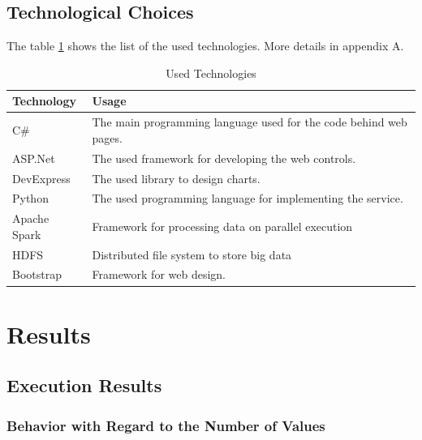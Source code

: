 \subsection{Technological Choices}
The table \ref{ut} shows the list of the used technologies. More details in appendix A.
\begin{table}[!h]
\caption{Used Technologies}
\begin{center}
\begin{tabularx}{17cm}{ |p{3cm}|X| } 
 \hline
 \textbf{Technology} & \textbf{Usage}  \\ \hline
 
C\# & The main programming language used for the code behind web pages.\\ \hline
ASP.Net & The used framework for developing the web controls. \\ \hline
DevExpress & The used library to design charts.\\ \hline
Python & The used programming language for implementing the service.\\ \hline
Apache Spark & Framework for processing data on parallel execution\\ \hline
HDFS & Distributed file system to store big data \\ \hline
Bootstrap & Framework for web design. \\ \hline
\end{tabularx}
\end{center}
\label{ut}
\end{table}
\section{Results}
\subsection{Execution Results}
\subsubsection{Behavior with Regard to the Number of Values}

